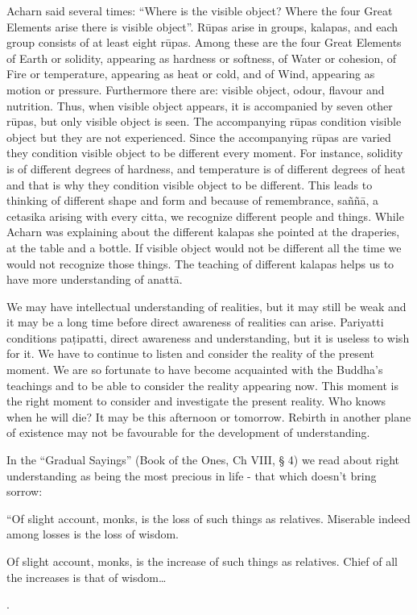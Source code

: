 {{{{{Acharn said several times: ``Where is
the visible object? Where the four Great Elements arise there is visible
object''. Rūpas arise in groups, kalapas, and each group consists of at
least eight rūpas. Among these are the four Great Elements of Earth or
solidity, appearing as hardness or softness, of Water or cohesion, of
Fire or temperature, appearing as heat or cold, and of Wind, appearing
as motion or pressure. Furthermore there are: visible object, odour,
flavour and nutrition. Thus, when visible object appears, it is
accompanied by seven other rūpas, but only visible object is seen. The
accompanying rūpas condition visible object but they are not
experienced. Since the accompanying rūpas are varied they condition
visible object to be different every moment. For instance, solidity is
of different degrees of hardness, and temperature is of different
degrees of heat and that is why they condition visible object to be
different. This leads to thinking of different shape and form and
because of remembrance, saññā, a cetasika arising with every citta, we
recognize different people and things. While Acharn was explaining about
the different kalapas she pointed at the draperies, at the table and a
bottle. If visible object would not be different all the time we would
not recognize those things. The teaching of different kalapas helps us
to have more understanding of anattā. 

We may have intellectual understanding
of realities, but it may still be weak and it may be a long time before
direct awareness of realities can arise. Pariyatti conditions paṭipatti,
direct awareness and understanding, but it is useless to wish for it. We
have to continue to listen and consider the reality of the present
moment. We are so fortunate to have become acquainted with the Buddha's
teachings and to be able to consider the reality appearing now. This
moment is the right moment to consider and investigate the present
reality. Who knows when he will die? It may be this afternoon or
tomorrow. Rebirth in another plane of existence may not be favourable
for the development of understanding.

In the ``Gradual Sayings'' (Book of the
Ones, Ch VIII, § 4) we read about right understanding as being the most
precious in life - that which doesn't bring sorrow:

``Of slight account, monks, is the loss of such things as relatives.
Miserable indeed among losses is the loss of wisdom.

Of slight account, monks, is the increase of such things as relatives.
Chief of all the increases is that of wisdom\ldots{.

}}}}}}
